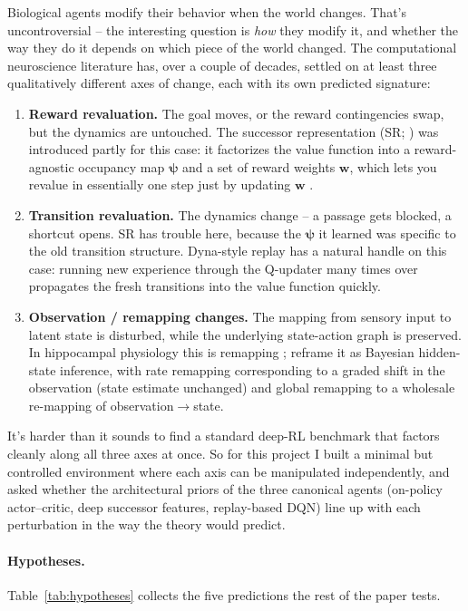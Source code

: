 \documentclass{article}
\begin{document}
Biological agents modify their behavior when the world changes. That's uncontroversial -- the interesting question is \emph{how} they modify it, and whether the way they do it depends on which piece of the world changed. The computational neuroscience literature has, over a couple of decades, settled on at least three qualitatively different axes of change, each with its own predicted signature:

\begin{enumerate}
  \item \textbf{Reward revaluation.} The goal moves, or the reward contingencies swap, but the dynamics are untouched. The successor representation (SR; \citet{dayan1993sr}) was introduced partly for this case: it factorizes the value function into a reward-agnostic occupancy map $\boldsymbol{\psi}$ and a set of reward weights $\mathbf{w}$, which lets you revalue in essentially one step just by updating $\mathbf{w}$ \citep{russek2017sr,momennejad2017sr}.
  \item \textbf{Transition revaluation.} The dynamics change -- a passage gets blocked, a shortcut opens. SR has trouble here, because the $\boldsymbol{\psi}$ it learned was specific to the old transition structure. Dyna-style replay \citep{sutton1990dyna} has a natural handle on this case: running new experience through the Q-updater many times over propagates the fresh transitions into the value function quickly.
  \item \textbf{Observation / remapping changes.} The mapping from sensory input to latent state is disturbed, while the underlying state-action graph is preserved. In hippocampal physiology this is remapping \citep{muller1987remap,leutgeb2005distinct}; \citet{sanders2020remap} reframe it as Bayesian hidden-state inference, with rate remapping corresponding to a graded shift in the observation (state estimate unchanged) and global remapping to a wholesale re-mapping of observation$\rightarrow$state.
\end{enumerate}

It's harder than it sounds to find a standard deep-RL benchmark that factors cleanly along all three axes at once. So for this project I built a minimal but controlled environment where each axis can be manipulated independently, and asked whether the architectural priors of the three canonical agents (on-policy actor--critic, deep successor features, replay-based DQN) line up with each perturbation in the way the theory would predict.

\paragraph{Hypotheses.} Table~\ref{tab:hypotheses} collects the five predictions the rest of the paper tests.
\end{document}

